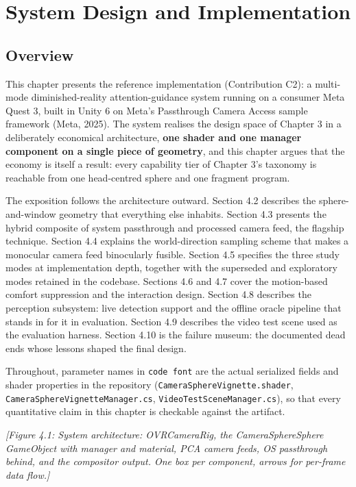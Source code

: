\chapter{System Design and Implementation}

\section{Overview}

This chapter presents the reference implementation (Contribution C2): a multi-mode diminished-reality
attention-guidance system running on a consumer Meta Quest 3, built in Unity 6 on Meta's
Passthrough Camera Access sample framework (Meta, 2025). The system realises the design space of Chapter 3 in a
deliberately economical architecture, \textbf{one shader and one manager component on a single piece of
geometry}, and this chapter argues that the economy is itself a result: every capability tier of
Chapter 3's taxonomy is reachable from one head-centred sphere and one fragment program.

The exposition follows the architecture outward. Section 4.2 describes the sphere-and-window
geometry that everything else inhabits. Section 4.3 presents the hybrid composite of system
passthrough and processed camera feed, the flagship technique. Section 4.4 explains the
world-direction sampling scheme that makes a monocular camera feed binocularly fusible.
Section 4.5 specifies the three study modes at implementation depth,
together with the superseded and exploratory modes retained in the codebase. Sections 4.6 and 4.7
cover the motion-based comfort suppression and the interaction design. Section 4.8 describes the
perception subsystem: live detection support and the offline oracle pipeline that stands in for it
in evaluation. Section 4.9 describes the video test scene used as the evaluation harness. Section
4.10 is the failure museum: the documented dead ends whose lessons shaped the final design.

Throughout, parameter names in \verb|code font| are the actual serialized fields and shader properties in
the repository (\verb|CameraSphereVignette.shader|, \verb|CameraSphereVignetteManager.cs|,
\verb|VideoTestSceneManager.cs|), so that every quantitative claim in this chapter is checkable against
the artifact.

\textit{[Figure 4.1: System architecture: OVRCameraRig, the CameraSphereSphere GameObject with manager and
material, PCA camera feeds, OS passthrough behind, and the compositor output. One box per component,
arrows for per-frame data flow.]}


